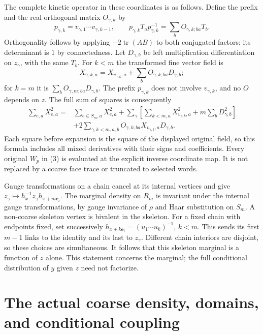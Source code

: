 \documentclass[11pt]{article}
\newcommand{\tr}{\operatorname{tr}}
\begin{document}
The complete kinetic operator in these coordinates is as follows.
Define the prefix and the real
orthogonal matrix $O_{\gamma,k}$ by
\[
 p_{\gamma,k}=v_{\gamma,1}\cdots v_{\gamma,k-1},\qquad
 p_{\gamma,k}T_a p_{\gamma,k}^{-1}
   =\sum_b O_{\gamma,k;ba}T_b.
\]
Orthogonality follows by applying $-2\tr(AB)$ to both conjugated factors;
its determinant is $1$ by connectedness. Let $D_{\gamma,b}$ be left
multiplication differentiation on $z_\gamma$, with the same $T_b$.
For $k<m$ the transformed fine vector field is
\[
 X_{\gamma,k,a}=X_{v_{\gamma,k},a}
            +\sum_bO_{\gamma,k;ba}D_{\gamma,b};
\]
for $k=m$ it is $\sum_bO_{\gamma,m;ba}D_{\gamma,b}$. The prefix
$p_{\gamma,k}$ does not involve $v_{\gamma,k}$, and no $O$ depends on $z$.
The full sum of squares is consequently
\begin{align}\label{eq:fulltensor}
 \sum_{e,a}X_{e,a}^2
 ={}&\sum_{e\in S_m,a}X_{e,a}^2
 +\sum_{\gamma}\left[\sum_{k<m,a}X_{v_{\gamma,k},a}^2
                      +m\sum_bD_{\gamma,b}^2\right]\nonumber\\
 &+2\sum_{\gamma,k<m,a,b}O_{\gamma,k;ba}
                    X_{v_{\gamma,k},a}D_{\gamma,b}.
\end{align}
Each square before expansion is the square of the displayed original
field, so this formula includes all mixed derivatives with their signs
and coefficients. Every original $W_p$ in (3) is evaluated at
the explicit inverse coordinate map. It is not replaced by a coarse face
trace or truncated to selected words.

Gauge transformations on a chain cancel at its internal vertices and give
$z_\gamma\mapsto h_x^{-1}z_\gamma h_{x+m\mathbf e_i}$.
The marginal density on $R_m$ is invariant under the internal gauge
transformations, by gauge invariance of $\rho$ and Haar substitution on
$S_m$. A non-coarse skeleton vertex is bivalent in the skeleton. For a
fixed chain with endpoints fixed, set successively
$h_{x+k\mathbf e_i}=(u_1\cdots u_k)^{-1}$, $k<m$.
This sends its first $m-1$ links to the identity and its last to $z_\gamma$.
Different chain interiors are disjoint, so these choices are simultaneous.
It follows that this skeleton marginal is a function of $z$ alone.
This statement concerns the marginal; the full conditional distribution
of $y$ given $z$ need not factorize.

\section{The actual coarse density, domains, and conditional coupling}
\end{document}
